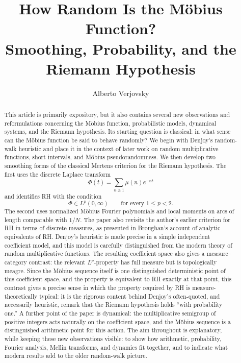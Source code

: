 \documentclass[11pt]{article}
\title{\textbf{How Random Is the M\"obius Function?\\
Smoothing, Probability, and the Riemann Hypothesis}}
\author{Alberto Verjovsky}
\date{}
\theoremstyle{remark}
\begin{document}
\maketitle

\begin{abstract}
This article is primarily expository, but it also contains several new
observations and reformulations concerning the M\"obius function,
probabilistic models, dynamical systems, and the Riemann hypothesis.  Its
starting question is classical: in what sense can the M\"obius function
be said to behave randomly?  We begin with Denjoy's random-walk heuristic
and place it in the context of later work on random multiplicative
functions, short intervals, and M\"obius pseudorandomness.  We then
develop two smoothing forms of the classical Mertens criterion for the
Riemann hypothesis.  The first uses the discrete Laplace transform
\[
\Phi(t)=\sum_{n\geq1}\mu(n)e^{-nt}
\]
and identifies RH with the condition
\[
\Phi\in L^p(0,\infty)
\qquad\text{for every }1\leq p<2.
\]
The second uses normalized M\"obius Fourier polynomials and local
moments on arcs of length comparable with \(1/N\).  The paper also
revisits the author's earlier criterion for RH in terms of discrete
measures, as presented in Broughan's account of analytic equivalents of
RH.  Denjoy's heuristic is made precise in a simple independent
coefficient model, and this model is carefully distinguished from the
modern theory of random multiplicative functions.  The resulting
coefficient space also gives a measure--category contrast: the relevant
\(L^p\)-property has full measure but is topologically meagre.  Since
the M\"obius sequence itself is one distinguished deterministic point of this coefficient
space, and the property is equivalent to RH exactly at that point,
this contrast gives a precise sense in which the property required by RH is
measure-theoretically typical: it is the rigorous content behind Denjoy's
often-quoted, and necessarily heuristic, remark that the Riemann hypothesis
holds ``with probability one.''  A further
point of the paper is dynamical: the multiplicative semigroup of positive
integers acts naturally on the coefficient space, and the M\"obius
sequence is a distinguished arithmetic point for this action.  The aim
throughout is explanatory, while keeping these new observations visible:
to show how arithmetic, probability, Fourier analysis, Mellin transforms,
and dynamics fit together, and to indicate what modern results add to
the older random-walk picture.
\end{abstract}
\end{document}
